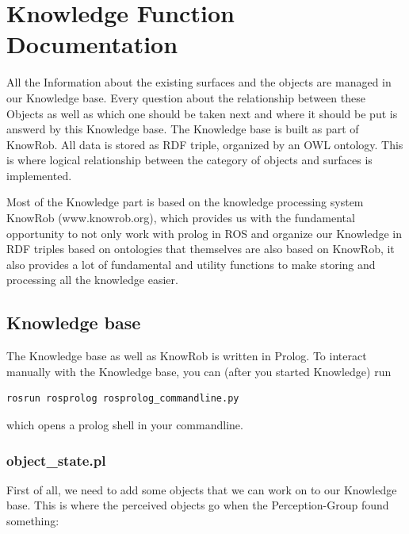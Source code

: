 \documentclass[main.tex]{subfiles}
\begin{document}
	\begingroup

	\renewcommand{\cleardoublepage}{}

	\renewcommand{\clearpage}{}

	\chapter{Knowledge Function Documentation}


All the Information about the existing surfaces and the objects are managed in our Knowledge base. Every question about the relationship between these Objects as well as which one should be taken next and where it should be put is answerd by this Knowledge base.  The Knowledge base is built as part of KnowRob. All data is stored as RDF triple, organized by an OWL ontology. This is where logical relationship between the category of objects and surfaces is implemented.

Most of the Knowledge part is based on the knowledge processing system KnowRob (www.knowrob.org), which provides us with the fundamental opportunity to not only work with prolog in ROS and organize our Knowledge in RDF triples based on ontologies that themselves are also based on KnowRob, it also provides a lot of fundamental and utility functions to make storing and processing all the knowledge easier. 
		
\section{Knowledge base}

The Knowledge base as well as KnowRob is written in Prolog. To interact manually with the Knowledge base, you can (after you started Knowledge) run
\begin{lstlisting}
rosrun rosprolog rosprolog_commandline.py
\end{lstlisting}
which opens a prolog shell in your commandline.

\subsection{object\_state.pl}

First of all, we need to add some objects that we can work on to our Knowledge base. This is where the perceived objects go when the Perception-Group found something:
\end{document}
